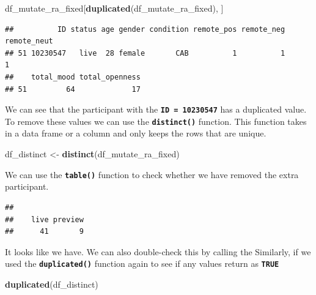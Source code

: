 \documentclass[
]{book}
\newenvironment{Shaded}{\begin{snugshade}}{\end{snugshade}}
\newcommand{\FunctionTok}[1]{\textcolor[rgb]{0.13,0.29,0.53}{\textbf{#1}}}
\newcommand{\NormalTok}[1]{#1}
\newcommand{\OtherTok}[1]{\textcolor[rgb]{0.56,0.35,0.01}{#1}}
\newcommand{\SpecialCharTok}[1]{\textcolor[rgb]{0.81,0.36,0.00}{\textbf{#1}}}
\begin{document}
\begin{Shaded}
\begin{Highlighting}[]
\NormalTok{df\_mutate\_ra\_fixed[}\FunctionTok{duplicated}\NormalTok{(df\_mutate\_ra\_fixed), ]}
\end{Highlighting}
\end{Shaded}

\begin{verbatim}
##          ID status age gender condition remote_pos remote_neg remote_neut
## 51 10230547   live  28 female       CAB          1          1           1
##    total_mood total_openness
## 51         64             17
\end{verbatim}

We can see that the participant with the \textbf{\texttt{ID\ =\ 10230547}} has a duplicated value. To remove these values we can use the \textbf{\texttt{distinct()}} function. This function takes in a data frame or a column and only keeps the rows that are unique.

\begin{Shaded}
\begin{Highlighting}[]
\NormalTok{df\_distinct }\OtherTok{\textless{}{-}} \FunctionTok{distinct}\NormalTok{(df\_mutate\_ra\_fixed)}
\end{Highlighting}
\end{Shaded}

We can use the \textbf{\texttt{table()}} function to check whether we have removed the extra participant.

\begin{Shaded}
\end{Shaded}

\begin{verbatim}
## 
##    live preview 
##      41       9
\end{verbatim}

It looks like we have. We can also double-check this by calling the Similarly, if we used the \textbf{\texttt{duplicated()}} function again to see if any values return as \textbf{\texttt{TRUE}}

\begin{Shaded}
\begin{Highlighting}[]
\FunctionTok{duplicated}\NormalTok{(df\_distinct)}
\end{Highlighting}
\end{Shaded}
\end{document}
